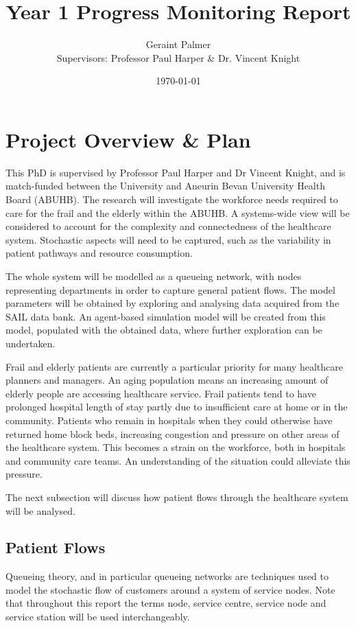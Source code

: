 \documentclass{article}
\title{Year 1 Progress Monitoring Report}
\author{Geraint Palmer\\{\small Supervisors: Professor Paul Harper \& Dr. Vincent Knight}}
\date{\today}
\begin{document}
\onehalfspacing

\maketitle


\section{Project Overview \& Plan}

This PhD is supervised by Professor Paul Harper and Dr Vincent Knight, and is match-funded between the University and Aneurin Bevan University Health Board (ABUHB).
The research will investigate the workforce needs required to care for the frail and the elderly within the ABUHB.
A systems-wide view will be considered to account for the complexity and connectedness of the healthcare system.
Stochastic aspects will need to be captured, such as the variability in patient pathways and resource consumption.

The whole system will be modelled as a queueing network, with nodes representing departments in order to capture general patient flows.
The model parameters will be obtained by exploring and analysing data acquired from the SAIL data bank.
An agent-based simulation model will be created from this model, populated with
the obtained data, where further exploration can be undertaken.

Frail and elderly patients are currently a particular priority for many healthcare planners and managers.
An aging population means an increasing amount of elderly people are accessing healthcare service.
Frail patients tend to have prolonged hospital length of stay partly due to insufficient care at home or in the community.
Patients who remain in hospitals when they could otherwise have returned home block beds, increasing congestion and pressure on other areas of the healthcare system.
This becomes a strain on the workforce, both in hospitals and community care teams.
An understanding of the situation could alleviate this pressure.

The next subsection will discuss how patient flows through the healthcare system will be analysed.

\subsection{Patient Flows}

Queueing theory, and in particular queueing networks are techniques used to model the stochastic flow of customers around a system of service nodes.
Note that throughout this report the terms node, service centre, service node and service station will be used interchangeably.
\end{document}
